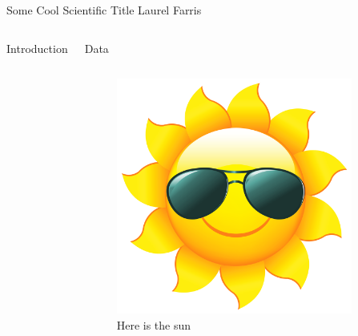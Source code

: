 \documentclass[t]{beamer}
\begin{document}
\begin{frame}[t]{Some Cool Scientific Title}
    {Laurel Farris}
    \begin{block}{} %

    \begin{columns}
        \begin{block}{Introduction}
            \lipsum[1]
        \end{block}
        \begin{block}{Data}
            \begin{columns}
                \begin{figure}
                    \includegraphics[width=0.9\textwidth]{sun.png}
                    \caption{Here is the sun}
                \end{figure}
                \lipsum[2]
            \end{columns}
        \end{block}



\end{columns}
\end{block}
\end{frame}
\end{document}

